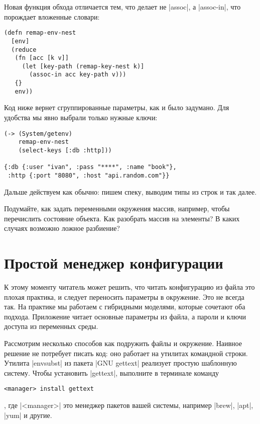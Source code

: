 Новая функция обхода отличается тем, что делает не \spverb|assoc|, а \spverb|assoc-in|, что
порождает вложенные словари:

\begin{verbatim}
(defn remap-env-nest
  [env]
  (reduce
   (fn [acc [k v]]
     (let [key-path (remap-key-nest k)]
       (assoc-in acc key-path v)))
   {}
   env))
\end{verbatim}

Код ниже вернет сгруппированные параметры, как и было задумано. Для удобства мы
явно выбрали только нужные ключи:

\begin{verbatim}
(-> (System/getenv)
    remap-env-nest
    (select-keys [:db :http]))

{:db {:user "ivan", :pass "****", :name "book"},
 :http {:port "8080", :host "api.random.com"}}
\end{verbatim}

Дальше действуем как обычно: пишем спеку, выводим типы из строк и так далее.

Подумайте, как задать переменными окружения массив, например, чтобы перечислить
состояние объекта. Как разобрать массив на элементы? В каких случаях возможно
ложное разбиение?

\section{Простой менеджер конфигурации}

К этому моменту читатель может решить, что читать конфигурацию из файла это
плохая практика, и следует переносить параметры в окружение. Это не всегда
так. На практике мы работаем с гибридными моделями, которые сочетают оба
подхода. Приложение читает основные параметры из файла, а пароли и ключи доступа
из переменных среды.

Рассмотрим несколько способов как подружить файлы и окружение. Наивное решение
не потребует писать код: оно работает на утилитах командной строки. Утилита
\spverb|envsubst| из пакета \spverb|GNU gettext| реализует простую шаблонную систему. Чтобы
установить \spverb|gettext|, выполните в терминале команду

\begin{verbatim}
<manager> install gettext
\end{verbatim}

, где \spverb|<manager>| это менеджер пакетов вашей системы, например
\spverb|brew|, \spverb|apt|, \spverb|yum| и другие.

